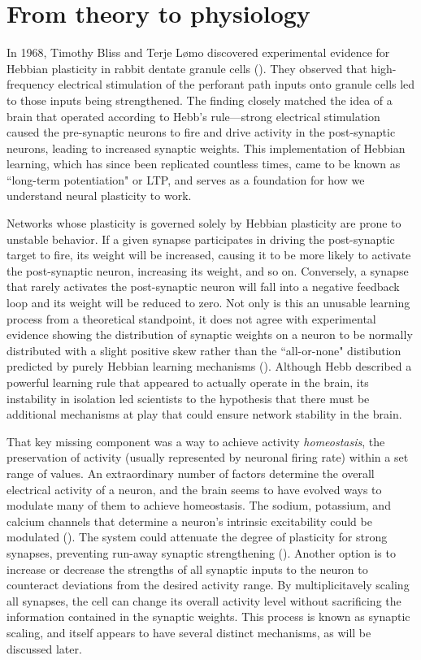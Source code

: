 \section{From theory to physiology}

In 1968, Timothy Bliss and Terje L\o mo discovered experimental evidence for Hebbian plasticity in rabbit dentate granule cells (\cite{Bliss1973}). They observed that high-frequency electrical stimulation of the perforant path inputs onto granule cells led to those inputs being strengthened. The finding closely matched the idea of a brain that operated according to Hebb's rule---strong electrical stimulation caused the pre-synaptic neurons to fire and drive activity in the post-synaptic neurons, leading to increased synaptic weights. This implementation of Hebbian learning, which has since been replicated countless times, came to be known as ``long-term potentiation" or LTP, and serves as a foundation for how we understand neural plasticity to work.

Networks whose plasticity is governed solely by Hebbian plasticity are prone to unstable behavior. If a given synapse participates in driving the post-synaptic target to fire, its weight will be increased, causing it to be more likely to activate the post-synaptic neuron, increasing its weight, and so on. Conversely, a synapse that rarely activates the post-synaptic neuron will fall into a negative feedback loop and its weight will be reduced to zero. Not only is this an unusable learning process from a theoretical standpoint, it does not agree with experimental evidence showing the distribution of synaptic weights on a neuron to be normally distributed with a slight positive skew rather than the ``all-or-none" distibution predicted by purely Hebbian learning mechanisms (\cite{Turrigiano1998}). Although Hebb described a powerful learning rule that appeared to actually operate in the brain, its instability in isolation led scientists to the hypothesis that there must be additional mechanisms at play that could ensure network stability in the brain.

That key missing component was a way to achieve activity \textit{homeostasis}, the preservation of activity (usually represented by neuronal firing rate) within a set range of values. An extraordinary number of factors determine the overall electrical activity of a neuron, and the brain seems to have evolved ways to modulate many of them to achieve homeostasis. The sodium, potassium, and calcium channels that determine a neuron's intrinsic excitability could be modulated (\cite{Franklin1992}). The system could attenuate the degree of plasticity for strong synapses, preventing run-away synaptic strengthening (\cite{VanRossum2000}). Another option is to increase or decrease the strengths of all synaptic inputs to the neuron to counteract deviations from the desired activity range. By multiplicitavely scaling all synapses, the cell can change its overall activity level without sacrificing the information contained in the synaptic weights. This process is known as synaptic scaling, and itself appears to have several distinct mechanisms, as will be discussed later.

